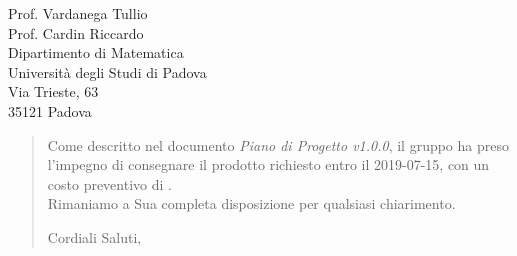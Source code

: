 \begin{letter}{
		Prof. Vardanega Tullio \\
		Prof. Cardin Riccardo \\
		Dipartimento di Matematica \\
		Università degli Studi di Padova \\
		Via Trieste, 63 \\
		35121 Padova}
\begin{quotation}
\noindent Come descritto nel documento \textit{Piano di Progetto v1.0.0}, il gruppo ha preso l'impegno di consegnare il prodotto richiesto entro il 2019-07-15, con un costo preventivo di  \textbf{}.\\

Rimaniamo a Sua completa disposizione per qualsiasi chiarimento.

\vspace{0.5cm}
\closing{ Cordiali Saluti,}
	

\end{quotation}
		
\end{letter}


